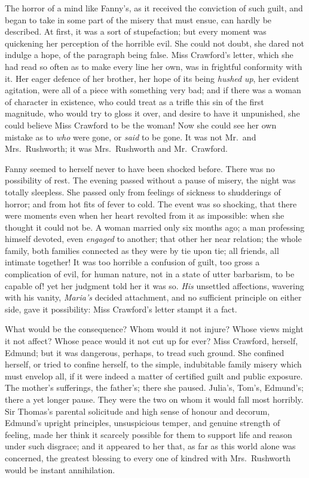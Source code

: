 The horror of a mind like Fanny's, as it received the
conviction of such guilt, and began to take in some part
of the misery that must ensue, can hardly be described.
At first, it was a sort of stupefaction; but every moment
was quickening her perception of the horrible evil.
She could not doubt, she dared not indulge a hope,
of the paragraph being false.  Miss Crawford's letter,
which she had read so often as to make every line her own,
was in frightful conformity with it.  Her eager defence
of her brother, her hope of its being \emph{hushed} \emph{up},
her evident agitation, were all of a piece with something
very bad; and if there was a woman of character in existence,
who could treat as a trifle this sin of the first magnitude,
who would try to gloss it over, and desire to have it
unpunished, she could believe Miss Crawford to be the woman!
Now she could see her own mistake as to \emph{who} were gone,
or \emph{said} to be gone.  It was not Mr.\ and Mrs.\ Rushworth;
it was Mrs.\ Rushworth and Mr.\ Crawford.

Fanny seemed to herself never to have been shocked before.
There was no possibility of rest.  The evening passed
without a pause of misery, the night was totally sleepless.
She passed only from feelings of sickness to shudderings
of horror; and from hot fits of fever to cold.  The event
was so shocking, that there were moments even when her
heart revolted from it as impossible:  when she thought
it could not be.  A woman married only six months ago;
a man professing himself devoted, even \emph{engaged} to another;
that other her near relation; the whole family,
both families connected as they were by tie upon tie;
all friends, all intimate together!  It was too horrible
a confusion of guilt, too gross a complication of evil,
for human nature, not in a state of utter barbarism,
to be capable of! yet her judgment told her it was so.
\emph{His} unsettled affections, wavering with his vanity,
\emph{Maria's} decided attachment, and no sufficient principle
on either side, gave it possibility:  Miss Crawford's
letter stampt it a fact.

What would be the consequence?  Whom would it not injure?
Whose views might it not affect?  Whose peace would it
not cut up for ever?  Miss Crawford, herself, Edmund;
but it was dangerous, perhaps, to tread such ground.
She confined herself, or tried to confine herself, to the simple,
indubitable family misery which must envelop all, if it were
indeed a matter of certified guilt and public exposure.
The mother's sufferings, the father's; there she paused.
Julia's, Tom's, Edmund's; there a yet longer pause.
They were the two on whom it would fall most horribly.
Sir Thomas's parental solicitude and high sense of honour
and decorum, Edmund's upright principles, unsuspicious temper,
and genuine strength of feeling, made her think it
scarcely possible for them to support life and reason
under such disgrace; and it appeared to her that, as far
as this world alone was concerned, the greatest blessing
to every one of kindred with Mrs.\ Rushworth would be
instant annihilation.

